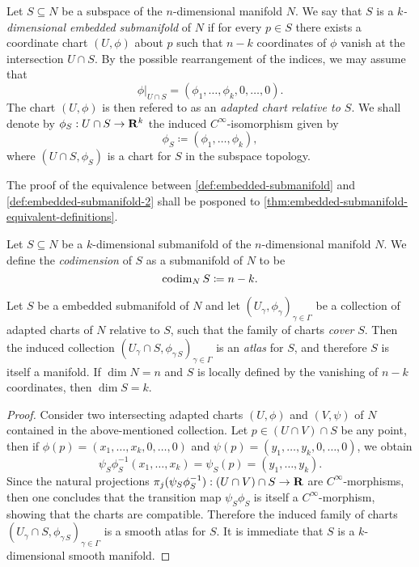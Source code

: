 \begin{definition}
\label{def:embedded-submanifold-2}
Let \(S \subseteq N\) be a subspace of the \(n\)-dimensional manifold \(N\). We
say that \(S\) is a \emph{\(k\)-dimensional embedded submanifold} of \(N\) if
for every \(p \in S\) there exists a coordinate chart \((U, \phi)\) about \(p\)
such that \(n-k\) coordinates of \(\phi\) vanish at the intersection
\(U \cap S\). By the possible rearrangement of the indices, we may assume that
\[
\phi|_{U \cap S} = (\phi_1, \dots, \phi_k, 0, \dots, 0).
\]
The chart \((U, \phi)\) is then refered to as an \emph{adapted chart relative to
  \(S\)}. We shall denote by \(\phi_S: U \cap S \to \mathbf{R}^k\) the induced
\(C^{\infty}\)-isomorphism given by
\[
\phi_S \coloneq (\phi_1, \dots, \phi_k),
\]
where \((U \cap S, \phi_S)\) is a chart for \(S\) in the subspace topology.
\end{definition}

The proof of the equivalence between \cref{def:embedded-submanifold} and
\cref{def:embedded-submanifold-2} shall be posponed to
\cref{thm:embedded-submanifold-equivalent-definitions}.

\begin{definition}[Codimension]
\label{def:codimension}
Let \(S \subseteq N\) be a \(k\)-dimensional submanifold of the
\(n\)-dimensional manifold \(N\). We define the \emph{codimension} of \(S\) as a
submanifold of \(N\) to be
\[
\operatorname{codim}_N S \coloneq n - k.
\]
\end{definition}

\begin{proposition}
\label{prop:embedded-submanifold}
Let \(S\) be a embedded submanifold of \(N\) and let
\((U_{\gamma}, \phi_{\gamma})_{\gamma \in \Gamma}\) be a collection of adapted
charts of \(N\) relative to \(S\), such that the family of charts \emph{cover}
\(S\). Then the induced collection
\((U_{\gamma} \cap S, \phi_{\gamma\, S})_{\gamma \in \Gamma}\) is an
\emph{atlas} for \(S\), and therefore \(S\) is itself a manifold. If
\(\dim N = n\) and \(S\) is locally defined by the vanishing of \(n-k\)
coordinates, then \(\dim S = k\).
\end{proposition}

\begin{proof}
Consider two intersecting adapted charts \((U, \phi)\) and \((V, \psi)\) of
\(N\) contained in the above-mentioned collection. Let \(p \in (U \cap V) \cap
S\) be any point, then if \(\phi(p) = (x_1, \dots, x_k, 0, \dots, 0)\) and
\(\psi(p) = (y_1, \dots, y_k, 0, \dots, 0)\), we obtain
\[
\psi_S \phi_S^{-1}(x_1, \dots, x_k) = \psi_S(p) = (y_1, \dots, y_k).
\]
Since the natural projections
\(\pi_j(\psi_S \phi_S^{-1}): (U \cap V) \cap S \to \mathbf{R}\) are
\(C^{\infty}\)-morphisms, then one concludes that the transition map
\(\psi_S \phi_S\) is itself a \(C^{\infty}\)-morphism, showing that the charts
are compatible. Therefore the induced family of charts
\((U_{\gamma} \cap S, \phi_{\gamma\, S})_{\gamma \in \Gamma}\) is a smooth atlas
for \(S\). It is immediate that \(S\) is a \(k\)-dimensional smooth manifold.
\end{proof}

